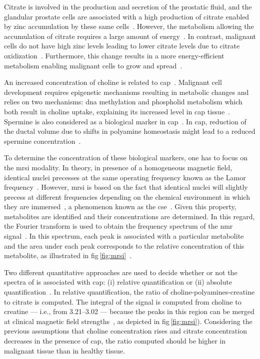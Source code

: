 Citrate is involved in the production and secretion of the prostatic fluid, and
the glandular prostate cells are associated with a high production of citrate
enabled by zinc accumulation by these same cells~\cite{Costello2006}.
However, the metabolism allowing the accumulation of citrate requires a large
amount of energy~\cite{Costello2006}.
In contrast, malignant cells do not have high zinc levels leading to lower
citrate levels due to citrate oxidization~\cite{Costello2006}.
Furthermore, this change results in a more energy-efficient metabolism enabling
malignant cells to grow and spread~\cite{Costello2006}.

An increased concentration of choline is related to \ac{cap}~\cite{Awwad2012}.
Malignant cell development requires epigenetic mechanisms resulting in
metabolic changes and relies on two mechanisms: \ac{dna} methylation and
phospholid metabolism which both result in choline uptake, explaining its
increased level in \ac{cap} tissue~\cite{Awwad2012}.
Spermine is also considered as a biological marker in
\ac{cap}~\cite{Graaf2000,Giskeodegard2013}.
In \ac{cap}, reduction of the ductal volume due to shifts in polyamine
homeostasis might lead to a reduced spermine concentration~\cite{Graaf2000}.

To determine the concentration of these biological markers, one has to focus on
the \ac{mrsi} modality.
In theory, in presence of a homogeneous magnetic field, identical nuclei
precesses at the same operating frequency known as the Lamor
frequency~\cite{Haacke1999}.
However, \ac{mrsi} is based on the fact that identical nuclei will slightly
precess at different frequencies depending on the chemical environment in which
they are immersed~\cite{Haacke1999}, a phenomenon known as the
\ac{cse}~\cite{Parfait2010}.
Given this property, metabolites are identified and their concentrations are
determined.
In this regard, the Fourier transform is used to obtain the frequency spectrum
of the \ac{nmr} signal~\cite{Haacke1999,Parfait2010}.
In this spectrum, each peak is associated with a particular metabolite and the
area under each peak corresponds to the relative concentration of this
metabolite, as illustrated in \acs{fig}\,\ref{fig:mrsi}~\cite{Parfait2010}.

Two different quantitative approaches are used to decide whether or not the
spectra of  is associated with \ac{cap}: (i) relative quantification
or (ii) absolute quantification~\cite{Lemaitre2011}.
In relative quantification, the ratio of choline-polyamines-creatine to citrate
is computed.
The integral of the signal is computed from choline to creatine --- i.e., from
\SIrange{3.21}{3.02}{\ppm} --- because the peaks in this region can be merged
at clinical magnetic field strengths~\cite{Hoeks2011,Graaf2000}, as depicted in
\acs{fig}\,\ref{fig:mrsi}).
Considering the previous assumptions that choline concentration rises and
citrate concentration decreases in the presence of \ac{cap}, the ratio computed
should be higher in malignant tissue than in healthy tissue.

